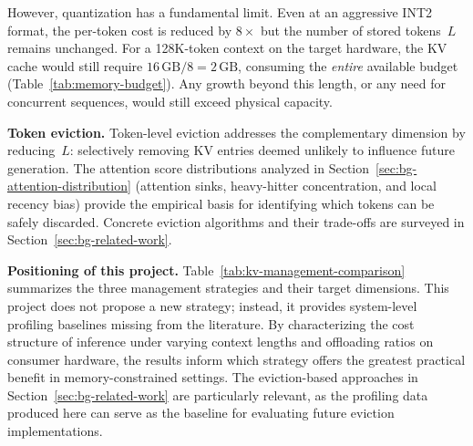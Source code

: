 \documentclass[
english,                 %
bibtex,                  %
]{kththesis}
\numberwithin{listing}{chapter}
\begin{document}
However, quantization has a fundamental limit. Even at an aggressive INT2 format, the per-token cost is reduced by $8\times$ but the number of stored tokens~$L$ remains unchanged. For a 128K-token context on the target hardware, the \gls{KV} cache would still require $16\,\text{GB} / 8 = 2\,\text{GB}$, consuming the \textit{entire} available budget (Table~\ref{tab:memory-budget}). Any growth beyond this length, or any need for concurrent sequences, would still exceed physical capacity.

\textbf{Token eviction.} Token-level eviction addresses the complementary dimension by reducing~$L$: selectively removing \gls{KV} entries deemed unlikely to influence future generation. The attention score distributions analyzed in Section~\ref{sec:bg-attention-distribution} (attention sinks, heavy-hitter concentration, and local recency bias) provide the empirical basis for identifying which tokens can be safely discarded. Concrete eviction algorithms and their trade-offs are surveyed in Section~\ref{sec:bg-related-work}.

\textbf{Positioning of this project.} Table~\ref{tab:kv-management-comparison} summarizes the three management strategies and their target dimensions. This project does not propose a new strategy; instead, it provides system-level profiling baselines missing from the literature. By characterizing the cost structure of inference under varying context lengths and offloading ratios on consumer hardware, the results inform which strategy offers the greatest practical benefit in memory-constrained settings. The eviction-based approaches in Section~\ref{sec:bg-related-work} are particularly relevant, as the profiling data produced here can serve as the baseline for evaluating future eviction implementations.


\begin{table}[!ht]
  \centering
  \caption{Comparison of \gls{KV} cache management strategies and their target dimensions in Equation~\ref{eq:kv-memory}.}
  \label{tab:kv-management-comparison}
\end{table}
\end{document}
